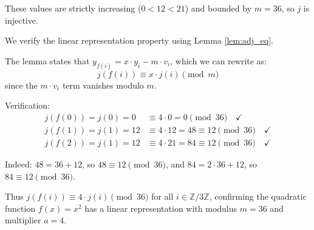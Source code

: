 \begin{remark}
These values are strictly increasing ($0 < 12 < 21$) and bounded by $m = 36$, so $j$ is injective.

We verify the linear representation property using Lemma \ref{lem:adj_eq}. 

The lemma states that $y_{f(i)} = x \cdot y_i - m \cdot v_i$, which we can rewrite as:
$$j(f(i)) \equiv x \cdot j(i) \pmod{m}$$
since the $m \cdot v_i$ term vanishes modulo $m$.

Verification:
\begin{align*}
j(f(0)) = j(0) = 0 &\equiv 4 \cdot 0 = 0 \pmod{36} \quad\checkmark \\
j(f(1)) = j(1) = 12 &\equiv 4 \cdot 12 = 48 \equiv 12 \pmod{36} \quad\checkmark \\
j(f(2)) = j(1) = 12 &\equiv 4 \cdot 21 = 84 \equiv 12 \pmod{36} \quad\checkmark
\end{align*}

Indeed: $48 = 36 + 12$, so $48 \equiv 12 \pmod{36}$, and $84 = 2 \cdot 36 + 12$, so $84 \equiv 12 \pmod{36}$.

Thus $j(f(i)) \equiv 4 \cdot j(i) \pmod{36}$ for all $i \in \mathbb{Z}/3\mathbb{Z}$, confirming the quadratic function $f(x) = x^2$ has a linear representation with modulus $m = 36$ and multiplier $a = 4$.
\end{remark}
